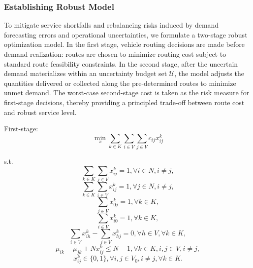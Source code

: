 \documentclass[preprint,12pt,authoryear]{elsarticle}
\begin{document}
\subsubsection{Establishing Robust Model}
To mitigate service shortfalls and rebalancing risks induced by demand forecasting errors and operational uncertainties, we formulate a two-stage robust optimization model. In the first stage, vehicle routing decisions are made before demand realization: routes are chosen to minimize routing cost subject to standard route feasibility constraints. In the second stage, after the uncertain demand materializes within an uncertainty budget set $\mathcal{U}$, the model adjusts the quantities delivered or collected along the pre-determined routes to minimize unmet demand. The worst-case second-stage cost is taken as the risk measure for first-stage decisions, thereby providing a principled trade-off between route cost and robust service level.

First-stage:
\begin{equation}\label{ques1}
\min_{x} \sum_{k\in K}\sum_{i\in V}\sum_{j\in V}c_{ij}x_{ij}^k
\end{equation}

s.t. 
\begin{equation}\label{cons1}
    \sum_{k\in K}\sum_{j\in V}x_{ij}^k = 1, \forall i\in N, i\neq j,
\end{equation}
\begin{equation}\label{cons111}
    \sum_{k\in K}\sum_{i\in V}x_{ij}^k = 1, \forall j\in N, i\neq j,
\end{equation}
\begin{equation}\label{cons2}
    \sum_{j\in V}x_{0j}^k = 1, \forall k\in K,
\end{equation}
\begin{equation}\label{cons3}
    \sum_{i\in V}x_{i0}^k = 1, \forall k\in K,
\end{equation}
\begin{equation}\label{cons4}
    \sum_{i\in V}x_{ih}^k-\sum_{j\in V}x_{hj}^k= 0, \forall h\in V, \forall k\in K,
\end{equation}
\begin{equation}\label{cons5}
    \mu_{ik}-\mu_{jk}+Nx_{ij}^k\leq N-1, \forall k\in K, i,j\in V, i\neq j,
\end{equation}
\begin{equation}\label{cons6}
    x_{ij}^k\in\{0,1\}, \forall i,j\in V_0, i\neq j, \forall  k\in K.
\end{equation}
\end{document}
